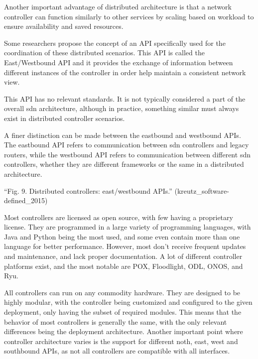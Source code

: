 Another important advantage of distributed architecture is that a network controller can function similarly to other services by scaling based on workload to ensure availability and saved resources. \cite{peterson_software-defined_2021}

Some researchers propose the concept of an API specifically used for the coordination of these distributed scenarios. This API is called the East/Westbound API and it provides the exchange of information between different instances of the controller in order help maintain a consistent network view.\cite{kreutz_software-defined_2015}

This API has no relevant standards\cite{zhu_sdn_2020}. It is not typically considered a part of the overall \gls{sdn} architecture, although in practice, something similar must always exist in distributed controller scenarios.

A finer distinction can be made between the eastbound and westbound APIs. The eastbound API refers to communication between \gls{sdn} controllers and legacy routers, while the westbound API refers to communication between different \gls{sdn} controllers, whether they are different frameworks or the same in a distributed architecture. \cite{kreutz_software-defined_2015}

“Fig. 9. Distributed controllers: east/westbound APIs.” (kreutz_software-defined_2015)

Most controllers are licensed as open source, with few having a proprietary license. They are programmed in a large variety of programming languages, with Java and Python being the most used, and some even contain more than one language for better performance. However, most don’t receive frequent updates and maintenance, and lack proper documentation\cite{zhu_sdn_2020}. A lot of different controller platforms exist, and the most notable are POX, Floodlight, ODL, ONOS, and Ryu\cite{zhu_sdn_2020}. 

All controllers can run on any commodity hardware\cite{kreutz_software-defined_2015}. They are designed to be highly modular, with the controller being customized and configured to the given deployment, only having the subset of required modules\cite{peterson_software-defined_2021}. This means that the behavior of most controllers is generally the same, with the only relevant differences being the deployment architecture. Another important point where controller architecture varies is the support for different noth, east, west and southbound APIs, as not all controllers are compatible with all interfaces. \cite{zhu_sdn_2020}


